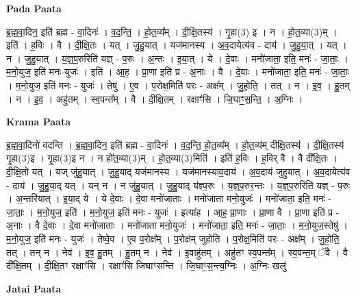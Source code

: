 \documentclass[17pt]{extarticle}
\begin{document}
\textbf{Pada Paata} \newline

ब्र॒ह्म॒वा॒दिन॒ इति॑ ब्रह्म - वा॒दिनः॑ । व॒द॒न्ति॒ । हो॒त॒व्य᳚म् । दी॒क्षि॒तस्य॑ । गृ॒हा(3) इ । न । हो॒त॒व्या(3)म् । इति॑ । ह॒विः । वै । दी॒क्षि॒तः । यत् । जु॒हु॒यात् । यज॑मानस्य । अ॒व॒दायेत्य॑व - दाय॑ । जु॒हु॒या॒त् । यत् । न । जु॒हु॒यात् । य॒ज्ञ्॒प॒रुरिति॑ यज्ञ् - प॒रुः । अ॒न्तः । इ॒या॒त् । ये । दे॒वाः । मनो॑जाता॒ इति॒ मनः॑ - जा॒ताः॒ । म॒नो॒युज॒ इति॑ मनः-युजः॑ । इति॑ । आ॒ह॒ । प्रा॒णा इति॑ प्र - अ॒नाः । वै । दे॒वाः । मनो॑जाता॒ इति॒ मनः॑ - जा॒ताः॒ । म॒नो॒युज॒ इति॑ मनः - युजः॑ । तेषु॑ । ए॒व । प॒रोक्ष॒मिति॑ परः - अक्ष᳚म् । जु॒हो॒ति॒ । तत् । न । इ॒व॒ । हु॒तम् । न । इ॒व॒ । अहु॑तम् । स्व॒पन्त᳚म् । वै । दी॒क्षि॒तम् । रक्षाꣳ॑सि । जि॒घाꣳ॒॒स॒न्ति॒ । अ॒ग्निः ।  \newline


\textbf{Krama Paata} \newline

ब्र॒ह्म॒वा॒दिनो॑ वदन्ति । ब्र॒ह्म॒वा॒दिन॒ इति॑ ब्रह्म - वा॒दिनः॑ । व॒द॒न्ति॒ हो॒त॒व्य᳚म् । हो॒त॒व्य॑म् दीक्षि॒तस्य॑ । दी॒क्षि॒तस्य॑ गृ॒हा(3)इ । गृ॒हा(3)इ न । न हो॑त॒व्या(3)म् । हो॒त॒व्या(3)मिति॑ । इति॑ ह॒विः । ह॒विर् वै । वै दी᳚क्षि॒तः । दी॒क्षि॒तो यत् । यज् जु॑हु॒यात् । जु॒हु॒याद् यज॑मानस्य । यज॑मानस्याव॒दाय॑ । अ॒व॒दाय॑ जुहुयात् । अ॒व॒दायेत्य॑व - दाय॑ । जु॒हु॒या॒द् यत् । यन् न । न जु॑हु॒यात् । जु॒हु॒याद् य॑ज्ञ्प॒रुः । य॒ज्ञ्॒प॒रुर॒न्तः । य॒ज्ञ्॒प॒रुरिति॑ यज्ञ् - प॒रुः । अ॒न्तरि॑यात् । इ॒या॒द् ये । ये दे॒वाः । दे॒वा मनो॑जाताः । मनो॑जाता मनो॒युजः॑ । मनो॑जाता॒ इति॒ मनः॑ - जा॒ताः॒ । म॒नो॒युज॒ इति॑ । म॒नो॒युज॒ इति॑ मनः - युजः॑ । इत्या॑ह । आ॒ह॒ प्रा॒णाः । प्रा॒णा वै । प्रा॒णा इति॑ प्र - अ॒नाः । वै दे॒वाः । दे॒वा मनो॑जाताः । मनो॑जाता मनो॒युजः॑ । मनो॑जाता॒ इति॒ मनः॑ - जा॒ताः॒ । म॒नो॒युज॒स्तेषु॑ । म॒नो॒युज॒ इति॑ मनः - युजः॑ । तेष्वे॒व । ए॒व प॒रोक्ष᳚म् । प॒रोक्ष॑म् जुहोति । प॒रोक्ष॒मिति॑ परः - अक्ष᳚म् । जु॒हो॒ति॒ तत् । तन् न । नेव॑ । इ॒व॒ हु॒तम् । हु॒तम् न । नेव॑ । इ॒वाहु॑तम् । अहु॑तꣳ स्व॒पन्त᳚म् । स्व॒पन्त॒म् ॅवै । वै दी᳚क्षि॒तम् । दी॒क्षि॒तꣳ रक्षाꣳ॑सि । रक्षाꣳ॑सि जिघाꣳसन्ति । जि॒घाꣳ॒॒स॒न्त्य॒ग्निः । अ॒ग्निः खलु॑ \newline

\textbf{Jatai Paata} \newline
\end{document}
